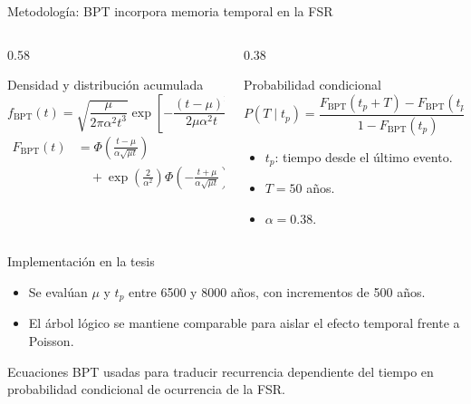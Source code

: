 \documentclass[aspectratio=169,10pt]{beamer}
\newcommand{\tightlist}{\setlength{\itemsep}{0.28em}}
\newcommand{\notecaption}[1]{%
  \vspace{0.16em}
  {\scriptsize\color{captiongray}\begin{minipage}{\linewidth}\centering #1\end{minipage}\par}
}
\begin{document}
\begin{frame}[t]{Metodología: BPT incorpora memoria temporal en la FSR}
\scriptsize
\setlength{\abovedisplayskip}{0.35em}
\setlength{\belowdisplayskip}{0.35em}
\begin{columns}[T,onlytextwidth]
  \begin{column}{0.58\textwidth}
    \begin{block}{Densidad y distribución acumulada}
    \[
      f_{\mathrm{BPT}}(t)=
      \sqrt{\frac{\mu}{2\pi\alpha^2t^3}}
      \exp\!\left[-\frac{(t-\mu)^2}{2\mu\alpha^2t}\right]
    \]
    \[
      \begin{aligned}
      F_{\mathrm{BPT}}(t)
      &= \Phi\!\left(\frac{t-\mu}{\alpha\sqrt{\mu t}}\right)\\
      &\quad + \exp\!\left(\frac{2}{\alpha^2}\right)
      \Phi\!\left(-\frac{t+\mu}{\alpha\sqrt{\mu t}}\right)
      \end{aligned}
    \]
    \end{block}
  \end{column}
  \begin{column}{0.38\textwidth}
    \begin{block}{Probabilidad condicional}
    \[
      P(T\mid t_p)=
      \frac{F_{\mathrm{BPT}}(t_p+T)-F_{\mathrm{BPT}}(t_p)}
      {1-F_{\mathrm{BPT}}(t_p)}
    \]
    \end{block}
    \begin{itemize}\tightlist
      \item \(t_p\): tiempo desde el último evento.
      \item \(T=50\) años.
      \item \(\alpha=0.38\).
    \end{itemize}
  \end{column}
\end{columns}
\vspace{0.1em}
\begin{block}{Implementación en la tesis}
  \begin{itemize}\tightlist
    \item Se evalúan \(\mu\) y \(t_p\) entre 6500 y 8000 años, con incrementos de 500 años.
    \item El árbol lógico se mantiene comparable para aislar el efecto temporal frente a Poisson.
  \end{itemize}
\end{block}
\notecaption{Ecuaciones BPT usadas para traducir recurrencia dependiente del tiempo en probabilidad condicional de ocurrencia de la FSR.}
\end{frame}
\end{document}
